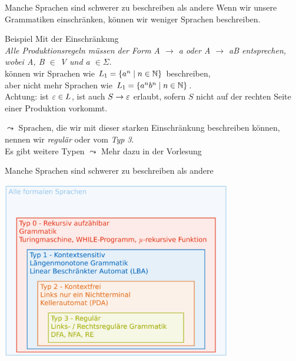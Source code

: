 %
%
%
%

\begin{frame}[fragile]{Manche Sprachen sind schwerer zu beschreiben als andere}
    Wenn wir unsere Grammatiken einschränken, können wir weniger Sprachen beschreiben.
    \begin{exampleblock}{Beispiel}
        Mit der Einschränkung\\
        \emph{Alle Produktionsregeln müssen der Form \alert{A $\to$ a oder A $\to$ aB} entsprechen, wobei A, B $\in$ V und a $\in \Sigma$}.\\
        können wir Sprachen wie $L_1 = \{a^n \mid n \in \mathbb{N}\}$ beschreiben,\\ aber nicht mehr Sprachen wie $L_1 = \{a^nb^n \mid n \in \mathbb{N}\}$.\\
        \alert{Achtung:} ist $\varepsilon \in L$, ist auch $S\to\varepsilon$ erlaubt, sofern $S$ nicht auf der rechten Seite einer Produktion vorkommt.
    \end{exampleblock}
    $\leadsto$ Sprachen, die wir mit dieser starken Einschränkung beschreiben können, nennen wir \alert{\emph{regulär}} oder vom \alert{\emph{Typ 3}}.\\
    Es gibt weitere Typen $\leadsto$ Mehr dazu in der Vorlesung
\end{frame}

\begin{frame}[fragile]{Manche Sprachen sind schwerer zu beschreiben als andere}
    \begin{center}
        \includegraphics[width=0.75\textwidth]{../figures/Chomsky.png}
    \end{center}
\end{frame}


